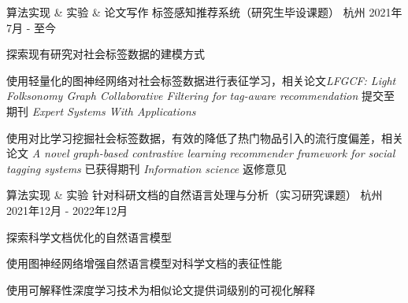 

\begin{cventries}

  \cventry
    {算法实现 \& 实验 \& 论文写作} %
    {标签感知推荐系统（研究生毕设课题）} %
    {杭州} %
    {2021年7月 - 至今} %
    {
      \begin{cvitems} %
        \item {探索现有研究对社会标签数据的建模方式}
        \item {使用轻量化的图神经网络对社会标签数据进行表征学习，相关论文\emph{LFGCF: Light Folksonomy Graph Collaborative Filtering for tag-aware recommendation} 提交至期刊 \emph{Expert Systems With Applications}}
        \item {使用对比学习挖掘社会标签数据，有效的降低了热门物品引入的流行度偏差，相关论文 \emph{A novel graph-based contrastive learning recommender framework for social tagging systems} 已获得期刊 \emph{Information science} 返修意见}
      \end{cvitems}
    }

  \cventry
    {算法实现 \& 实验} %
    {针对科研文档的自然语言处理与分析（实习研究课题）} %
    {杭州} %
    {2021年12月 - 2022年12月} %
    {
      \begin{cvitems}
        \item {探索科学文档优化的自然语言模型}
        \item {使用图神经网络增强自然语言模型对科学文档的表征性能}
        \item {使用可解释性深度学习技术为相似论文提供词级别的可视化解释}
      \end{cvitems}
    }

\end{cventries}


